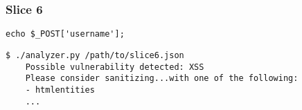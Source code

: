 \subsubsection*{Slice 6}
\label{sec:experimental.example.slice06}

\begin{lstlisting}[label={php.slice06},
        title={slice6.php}]
    echo $_POST['username'];
\end{lstlisting}

\begin{lstlisting}[label={out.example.slice06},
        caption={Shortened example XSS vulnerable slice analysis output}]
    $ ./analyzer.py /path/to/slice6.json
    Possible vulnerability detected: XSS
    Please consider sanitizing...with one of the following:
    - htmlentities
    ...
\end{lstlisting}
